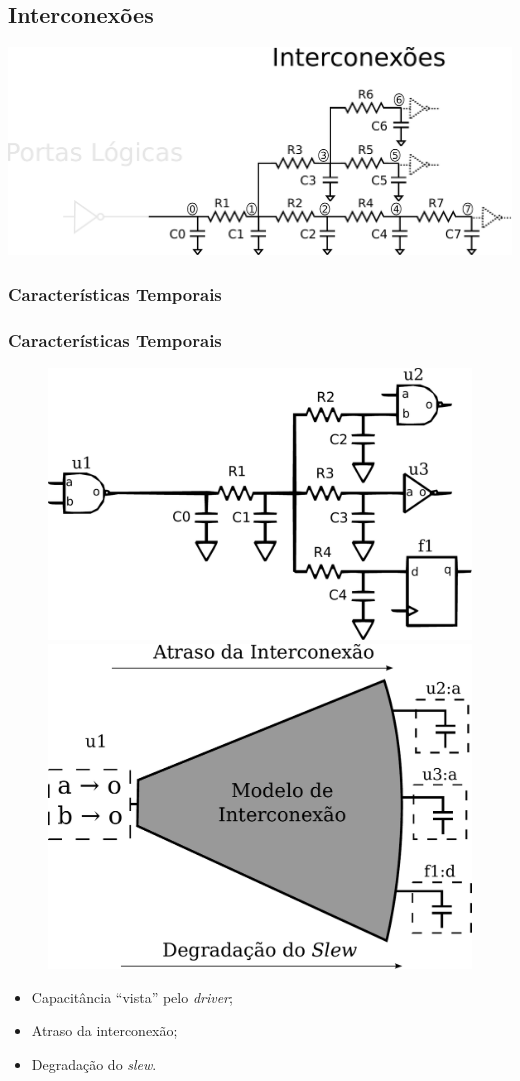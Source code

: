 \documentclass[10pt,a4paper]{beamer}
\begin{document}
		\subsection*{Interconexões}

			
			\begin{frame}
				\includegraphics[width=\textwidth]{img/circuito_interconexao.pdf} 
			\end{frame}
			
			\subsubsection*{Características Temporais}
			\begin{frame}
				\frametitle{Características Temporais}
				
				
					\begin{figure}
						\subfigure
						{
						\includegraphics[width=0.4 \textwidth]{img/modelagem1.pdf}
						}
						\subfigure
						{
						\includegraphics[width=0.4 \textwidth]{img/modelagem2.pdf}
						}
						
					\end{figure}
					\begin{itemize}
						\item Capacitância ``vista'' pelo \textit{driver};
						\item Atraso da interconexão;
						\item Degradação do \textit{slew}. 		
					\end{itemize}
			\end{frame}
			
\end{document}
